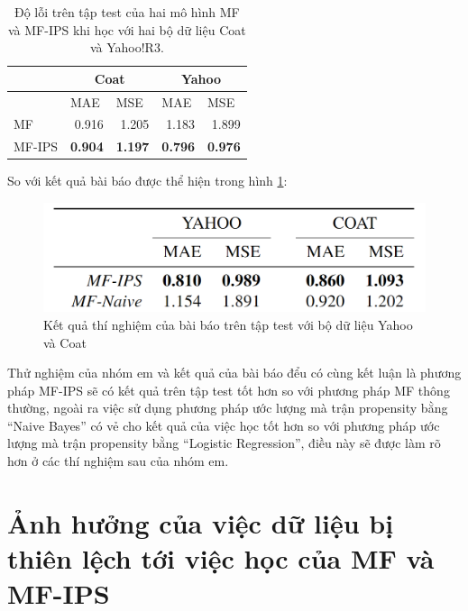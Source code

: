 \begin{table}[h]
\centering
\begin{tabular}{|l|rr|rr|}
\hline
      & \multicolumn{2}{c|}{Coat}                                      & \multicolumn{2}{c|}{Yahoo}                                     \\ \hline
      & \multicolumn{1}{l|}{MAE}            & \multicolumn{1}{l|}{MSE} & \multicolumn{1}{l|}{MAE}            & \multicolumn{1}{l|}{MSE} \\ \hline
MF & \multicolumn{1}{r|}{0.916}          & 1.205                    & \multicolumn{1}{r|}{1.183}          & 1.899                    \\ \hline
MF-IPS   & \multicolumn{1}{r|}{\textbf{0.904}} & \textbf{1.197}           & \multicolumn{1}{r|}{\textbf{0.796}} & \textbf{0.976}           \\ \hline
\end{tabular}
\caption{Độ lỗi trên tập test của hai mô hình MF và MF-IPS khi học với hai bộ dữ liệu Coat và Yahoo!R3.}
\label{table:4_implement}
\end{table}

So với kết quả bài báo được thể hiện trong hình \ref{fig:4_result}:

\begin{figure}[h]
    \centering
    \includegraphics[width=\textwidth]{images/Chapter4/result.png}
    \caption{Kết quả thí nghiệm của bài báo trên tập test với bộ dữ liệu Yahoo và Coat}
    \label{fig:4_result}
\end{figure}

Thử nghiệm của nhóm em và kết quả của bài báo đểu có cùng kết luận là phương pháp MF-IPS sẽ có kết quả trên tập test tốt hơn so với phương pháp MF thông thường, ngoài ra việc sử dụng phương pháp ước lượng mà trận propensity bằng ``Naive Bayes'' có vẻ cho kết quả của việc học tốt hơn so với phương pháp ước lượng mà trận propensity bằng ``Logistic Regression'', điều này sẽ được làm rõ hơn ở các thí nghiệm sau của nhóm em.

\section{Ảnh hưởng của việc dữ liệu bị thiên lệch tới việc học của MF và MF-IPS}
